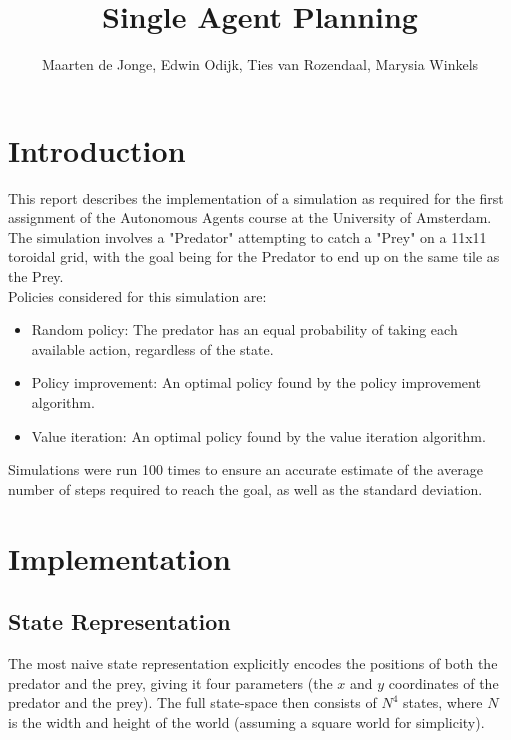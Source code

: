 \documentclass[a4paper, 12pt]{article}
\begin{document}
\title{Single Agent Planning}
\author{Maarten de Jonge, Edwin Odijk, Ties van Rozendaal, Marysia Winkels}
\maketitle

\section*{Introduction}
This report describes the implementation of a simulation as required for the first assignment of the Autonomous Agents course at the University of Amsterdam. The simulation involves a "Predator" attempting to catch a "Prey" on a 11x11 toroidal grid, with the goal being for the Predator to end up on the same tile as the Prey.\\

Policies considered for this simulation are:
\begin{itemize}
	\item Random policy: The predator has an equal probability of taking each
		available action, regardless of the state.
	\item Policy improvement: An optimal policy found by the policy improvement
		algorithm.
	\item Value iteration: An optimal policy found by the value iteration
		algorithm.
\end{itemize}

Simulations were run 100 times to ensure an accurate estimate of the average number of steps required to reach the goal, as well as the standard deviation.

\section{Implementation} 

\subsection{State Representation}
The most naive state representation explicitly encodes the positions of both the
predator and the prey, giving it four parameters (the $x$ and $y$ coordinates of
the predator and the prey). The full state-space then consists of $N^4$ states,
where $N$ is the width and height of the world (assuming a square world for
simplicity).
\end{document}
